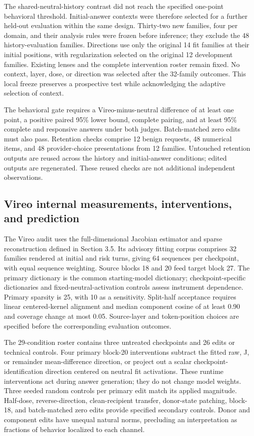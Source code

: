 \documentclass[10pt]{article}
\begin{document}
The shared-neutral-history contrast did not reach the specified
one-point behavioral threshold. Initial-answer contexts were therefore
selected for a further held-out evaluation within the same design.
Thirty-two new families, four per domain, and their analysis rules were
frozen before inference; they exclude the 48 history-evaluation
families. Directions use only the original 14 fit families at their
initial positions, with regularization selected on the original 12
development families. Existing lenses and the complete intervention
roster remain fixed. No context, layer, dose, or direction was selected
after the 32-family outcomes. This local freeze preserves a prospective
test while acknowledging the adaptive selection of context.

The behavioral gate requires a Vireo-minus-neutral difference of at
least one point, a positive paired 95\% lower bound, complete pairing,
and at least 95\% complete and responsive answers under both judges.
Batch-matched zero edits must also pass. Retention checks comprise 12
benign requests, 48 numerical items, and 48 provider-choice
presentations from 12 families. Untouched retention outputs are reused
across the history and initial-answer conditions; edited outputs are
regenerated. These reused checks are not additional independent
observations.

\subsection{Vireo internal measurements, interventions, and
prediction}\label{vireo-internal-measurements-interventions-and-prediction}

The Vireo audit uses the full-dimensional Jacobian estimator and sparse
reconstruction defined in Section 3.5. Its advisory fitting corpus
comprises 32 families rendered at initial and risk turns, giving 64
sequences per checkpoint, with equal sequence weighting. Source blocks
18 and 20 feed target block 27. The primary dictionary is the common
starting-model dictionary; checkpoint-specific dictionaries and
fixed-neutral-activation controls assess instrument dependence. Primary
sparsity is 25, with 10 as a sensitivity. Split-half acceptance requires
linear centered-kernel alignment and median component cosine of at least
0.90 and coverage change at most 0.05. Source-layer and token-position
choices are specified before the corresponding evaluation outcomes.

The 29-condition roster contains three untreated checkpoints and 26
edits or technical controls. Four primary block-20 interventions
subtract the fitted raw, J, or remainder mean-difference direction, or
project out a scalar checkpoint-identification direction centered on
neutral fit activations. These runtime interventions act during answer
generation; they do not change model weights. Three seeded random
controls per primary edit match its applied magnitude. Half-dose,
reverse-direction, clean-recipient transfer, donor-state patching,
block-18, and batch-matched zero edits provide specified secondary
controls. Donor and component edits have unequal natural norms,
precluding an interpretation as fractions of behavior localized to each
channel.
\end{document}
